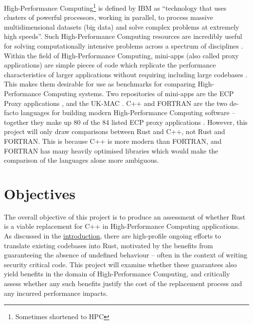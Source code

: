High-Performance Computing\footnote{Sometimes shortened to HPC} is defined by IBM as ``technology that uses clusters of powerful processors, working in parallel, to process massive multidimensional datasets (big data) and solve complex problems at extremely high speeds''\cite{WhatHPCIntroduction}. Such High-Performance Computing resources are incredibly useful for solving computationally intensive problems across a spectrum of disciplines \cite{JournalDescriptionInternational}. Within the field of High-Performance Computing, mini-apps (also called proxy applications) are simple pieces of code which replicate the performance characteristics of larger applications without requiring including large codebases \cite{heroux2013mantevo}. This makes them desirable for use as benchmarks for comparing High-Performance Computing systems. Two repositories of mini-apps are the ECP Proxy applications \cite{ECPProxyApplications}, and the UK-MAC \cite{UKMiniAppConsortium}. C++ and FORTRAN are the two de-facto languages for building modern High-Performance Computing software -- together they make up 80 of the 84 listed ECP proxy applications \cite{ECPProxyApps2018}. However, this project will only draw comparisons between Rust and C++, not Rust and FORTRAN. This is because C++ is more modern than FORTRAN, and FORTRAN has many heavily optimised libraries which would make the comparison of the languages alone more ambiguous.




\section{Objectives}
\label{sec:objectives}

The overall objective of this project is to produce an assessment of whether Rust is a viable replacement for C++ in High-Performance Computing applications. As discussed in the \hyperref[ch:introduction]{introduction}, there are high-profile ongoing efforts to translate existing codebases into Rust, motivated by the benefits from guaranteeing the absence of undefined behaviour -- often in the context of writing security critical code. This project will examine whether these guarantees also yield benefits in the domain of High-Performance Computing, and critically assess whether any such benefits justify the cost of the replacement process and any incurred performance impacts.

